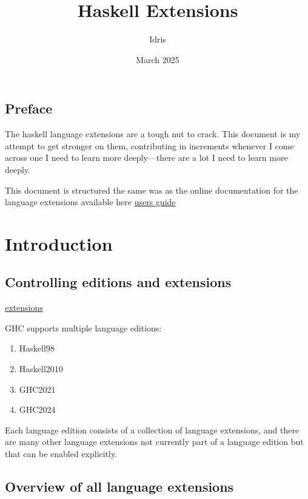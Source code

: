 \documentclass[openany, 12pt]{book}
\title{Haskell Extensions}
\author{Idris}
\date{March 2025}
\begin{document}
\tableofcontents

\frontmatter{}
\chapter{Preface}
The haskell language extensions are a tough nut to crack. This document is my
attempt to get stronger on them, contributing in increments whenever I come
across one I need to learn more deeply---there are a lot I need to learn more
deeply.

This document is structured the same was as the online documentation for the
language extensions available here
\href{https://ghc.gitlab.haskell.org/ghc/doc/users_guide/exts.html}{users guide}

\mainmatter{}
\part{Introduction}
\chapter{Controlling editions and extensions}
\href{https://ghc.gitlab.haskell.org/ghc/doc/users_guide/exts/control.html}{extensions}

GHC supports multiple language editions:

\begin{multicols}{4}
	\begin{enumerate}[label = {(\arabic*)}]
		\item Haskell98
		\item Haskell2010
		\item GHC2021
		\item GHC2024
	\end{enumerate}
\end{multicols}

Each language edition consists of a collection of language extensions, and there
are many other language extensions not currently part of a language edition but
that can be enabled explicitly.

\chapter{Overview of all language extensions}
\end{document}
